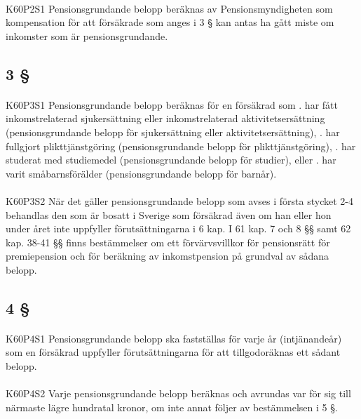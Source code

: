 \documentclass[a4paper,notitlepage,openany,10pt]{book}
\begin{document}
\paragraph*{}
{\tiny K60P2S1}
Pensionsgrundande belopp beräknas av Pensionsmyndigheten som kompensation för att försäkrade som anges i 3 § kan antas ha gått miste om inkomster som är pensionsgrundande.
\subsection*{3 §}
\paragraph*{}
{\tiny K60P3S1}
Pensionsgrundande belopp beräknas för en försäkrad som
. har fått inkomstrelaterad sjukersättning eller inkomstrelaterad aktivitetsersättning (pensionsgrundande belopp för sjukersättning eller aktivitetsersättning),
. har fullgjort plikttjänstgöring (pensionsgrundande belopp för plikttjänstgöring),
. har studerat med studiemedel (pensionsgrundande belopp för studier), eller
. har varit småbarnsförälder (pensionsgrundande belopp för barnår).
\paragraph*{}
{\tiny K60P3S2}
När det gäller pensionsgrundande belopp som avses i första stycket 2-4 behandlas den som är bosatt i Sverige som försäkrad även om han eller hon under året inte uppfyller förutsättningarna i 6 kap. I 61 kap. 7 och 8 §§ samt 62 kap. 38-41 §§ finns bestämmelser om ett förvärvsvillkor för pensionsrätt för premiepension och för beräkning av inkomstpension på grundval av sådana belopp.
\subsection*{4 §}
\paragraph*{}
{\tiny K60P4S1}
Pensionsgrundande belopp ska fastställas för varje år (intjänandeår) som en försäkrad uppfyller förutsättningarna för att tillgodoräknas ett sådant belopp.
\paragraph*{}
{\tiny K60P4S2}
Varje pensionsgrundande belopp beräknas och avrundas var för sig till närmaste lägre hundratal kronor, om inte annat följer av bestämmelsen i 5 §.
\end{document}
